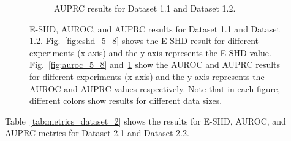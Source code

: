 \documentclass{lxaiproposal}
\begin{document}
\begin{figure}[h]
\begin{subfigure}{0.98\textwidth}
            \caption{AUPRC results for Dataset 1.1 and Dataset 1.2.}
            \label{fig:auprc_5_8}
        \end{subfigure}
        \caption{E-SHD, AUROC, and AUPRC results for Dataset 1.1 and Dataset 1.2. Fig.~\ref{fig:eshd_5_8} shows
        the E-SHD result for different experiments (x-axis) and the y-axis represents the E-SHD value. Fig.~\ref{fig:auroc_5_8} and~\ref{fig:auprc_5_8} show the AUROC and AUPRC results for different experiments (x-axis) and the
        y-axis represents the AUROC and AUPRC values respectively. Note that in each figure, different colors show results for different data
        sizes.}
        \label{fig:metrics_dataset_1}
    \end{figure}

    Table~\ref{tab:metrics_dataset_2} shows the results for E-SHD, AUROC, and AUPRC metrics for Dataset 2.1 and Dataset 2.2.
\end{document}
